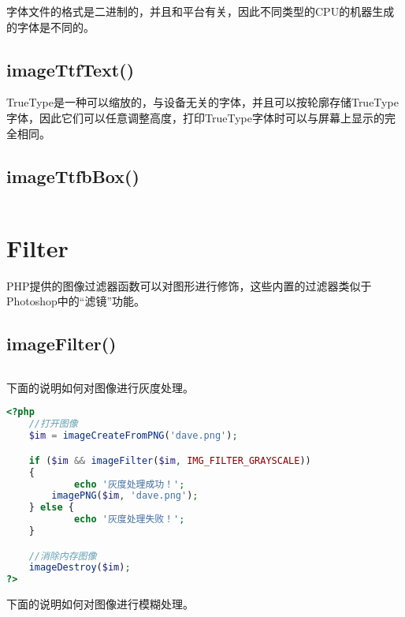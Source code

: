 字体文件的格式是二进制的，并且和平台有关，因此不同类型的CPU的机器生成的字体是不同的。

\subsection{imageTtfText()}


TrueType是一种可以缩放的，与设备无关的字体，并且可以按轮廓存储TrueType字体，因此它们可以任意调整高度，打印TrueType字体时可以与屏幕上显示的完全相同。


\subsection{imageTtfbBox()}




\begin{lstlisting}[language=PHP]

\end{lstlisting}



\section{Filter}


PHP提供的图像过滤器函数可以对图形进行修饰，这些内置的过滤器类似于Photoshop中的“滤镜”功能。


\subsection{imageFilter()}



\begin{lstlisting}[language=PHP]

\end{lstlisting}

下面的说明如何对图像进行灰度处理。


\begin{lstlisting}[language=PHP]
<?php
	//打开图像
	$im = imageCreateFromPNG('dave.png');

	if ($im && imageFilter($im, IMG_FILTER_GRAYSCALE)) 
	{
    		echo '灰度处理成功！';
	    imagePNG($im, 'dave.png');
	} else {
    		echo '灰度处理失败！';
	}

	//消除内存图像
	imageDestroy($im);
?>
\end{lstlisting}


下面的说明如何对图像进行模糊处理。



